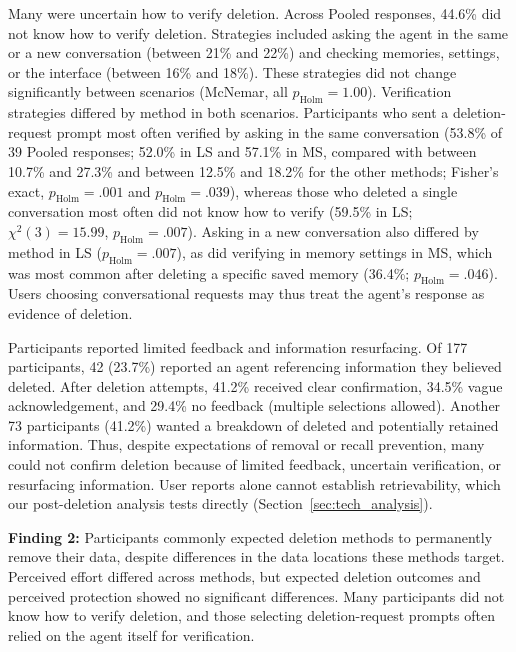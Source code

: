     Many were uncertain how to verify deletion.
    Across Pooled responses, 44.6\% did not know how to verify deletion.
    Strategies included asking the agent in the same or a new conversation (between 21\% and 22\%) and checking memories, settings, or the interface (between 16\% and 18\%).
    These strategies did not change significantly between scenarios (McNemar, all $p_{\mathrm{Holm}}=1.00$).
    Verification strategies differed by method in both scenarios.
    Participants who sent a deletion-request prompt most often verified by asking in the same conversation (53.8\% of 39 Pooled responses; 52.0\% in LS and 57.1\% in MS, compared with between 10.7\% and 27.3\% and between 12.5\% and 18.2\% for the other methods; Fisher's exact, $p_{\mathrm{Holm}}=.001$ and $p_{\mathrm{Holm}}=.039$), whereas those who deleted a single conversation most often did not know how to verify (59.5\% in LS; $\chi^2(3)=15.99$, $p_{\mathrm{Holm}}=.007$).
    Asking in a new conversation also differed by method in LS ($p_{\mathrm{Holm}}=.007$), as did verifying in memory settings in MS, which was most common after deleting a specific saved memory (36.4\%; $p_{\mathrm{Holm}}=.046$).
    Users choosing conversational requests may thus treat the agent's response as evidence of deletion.

    Participants reported limited feedback and information resurfacing.
    Of 177 participants, 42 (23.7\%) reported an agent referencing information they believed deleted.
    After deletion attempts, 41.2\% received clear confirmation, 34.5\% vague acknowledgement, and 29.4\% no feedback (multiple selections allowed).
    Another 73 participants (41.2\%) wanted a breakdown of deleted and potentially retained information.
    Thus, despite expectations of removal or recall prevention, many could not confirm deletion because of limited feedback, uncertain verification, or resurfacing information.
    User reports alone cannot establish retrievability, which our post-deletion analysis tests directly (Section~\ref{sec:tech_analysis}).

    \begin{takeawaybox}
    \textbf{Finding 2:} Participants commonly expected deletion methods to permanently remove their data, despite differences in the data locations these methods target. Perceived effort differed across methods, but expected deletion outcomes and perceived protection showed no significant differences. Many participants did not know how to verify deletion, and those selecting deletion-request prompts often relied on the agent itself for verification.
    \end{takeawaybox}